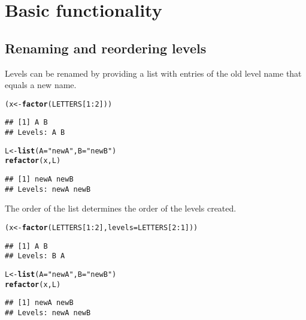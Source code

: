\documentclass{article}\usepackage[]{graphicx}\usepackage[]{color}
\makeatletter
\newcommand{\hlnum}[1]{\textcolor[rgb]{0.686,0.059,0.569}{#1}}%
\newcommand{\hlstr}[1]{\textcolor[rgb]{0.192,0.494,0.8}{#1}}%
\newcommand{\hlopt}[1]{\textcolor[rgb]{0,0,0}{#1}}%
\newcommand{\hlstd}[1]{\textcolor[rgb]{0.345,0.345,0.345}{#1}}%
\newcommand{\hlkwb}[1]{\textcolor[rgb]{0.69,0.353,0.396}{#1}}%
\newcommand{\hlkwc}[1]{\textcolor[rgb]{0.333,0.667,0.333}{#1}}%
\newcommand{\hlkwd}[1]{\textcolor[rgb]{0.737,0.353,0.396}{\textbf{#1}}}%
\newenvironment{kframe}{%
 \def\at@end@of@kframe{}%
 \ifinner\ifhmode%
  \def\at@end@of@kframe{\end{minipage}}%
  \begin{minipage}{\columnwidth}%
 \fi\fi%
 \def\FrameCommand##1{\hskip\@totalleftmargin \hskip-\fboxsep
 \colorbox{shadecolor}{##1}\hskip-\fboxsep
     \hskip-\linewidth \hskip-\@totalleftmargin \hskip\columnwidth}%
 \MakeFramed {\advance\hsize-\width
   \@totalleftmargin\z@ \linewidth\hsize
   \@setminipage}}%
 {\par\unskip\endMakeFramed%
 \at@end@of@kframe}
\newenvironment{knitrout}{}{} %
\makeatother
\begin{document}
\section{Basic functionality}

\subsection{Renaming and reordering levels}
Levels can be renamed by providing a list with entries of the old level name that equals a new name.
\begin{knitrout}
\color{fgcolor}\begin{kframe}
\begin{alltt}
\hlstd{(x} \hlkwb{<-} \hlkwd{factor}\hlstd{(LETTERS[}\hlnum{1}\hlopt{:}\hlnum{2}\hlstd{]))}
\end{alltt}
\begin{verbatim}
## [1] A B
## Levels: A B
\end{verbatim}
\begin{alltt}
\hlstd{L} \hlkwb{<-} \hlkwd{list}\hlstd{(}\hlkwc{A}\hlstd{=}\hlstr{"newA"}\hlstd{,} \hlkwc{B}\hlstd{=}\hlstr{"newB"}\hlstd{)}
\hlkwd{refactor}\hlstd{(x,L)}
\end{alltt}
\begin{verbatim}
## [1] newA newB
## Levels: newA newB
\end{verbatim}
\end{kframe}
\end{knitrout}
The order of the list determines the order of the levels created.
\begin{knitrout}
\color{fgcolor}\begin{kframe}
\begin{alltt}
\hlstd{(x} \hlkwb{<-} \hlkwd{factor}\hlstd{(LETTERS[}\hlnum{1}\hlopt{:}\hlnum{2}\hlstd{],} \hlkwc{levels}\hlstd{=LETTERS[}\hlnum{2}\hlopt{:}\hlnum{1}\hlstd{]))}
\end{alltt}
\begin{verbatim}
## [1] A B
## Levels: B A
\end{verbatim}
\begin{alltt}
\hlstd{L} \hlkwb{<-} \hlkwd{list}\hlstd{(}\hlkwc{A}\hlstd{=}\hlstr{"newA"}\hlstd{,} \hlkwc{B}\hlstd{=}\hlstr{"newB"}\hlstd{)}
\hlkwd{refactor}\hlstd{(x,L)}
\end{alltt}
\begin{verbatim}
## [1] newA newB
## Levels: newA newB
\end{verbatim}
\end{kframe}
\end{knitrout}
\end{document}
